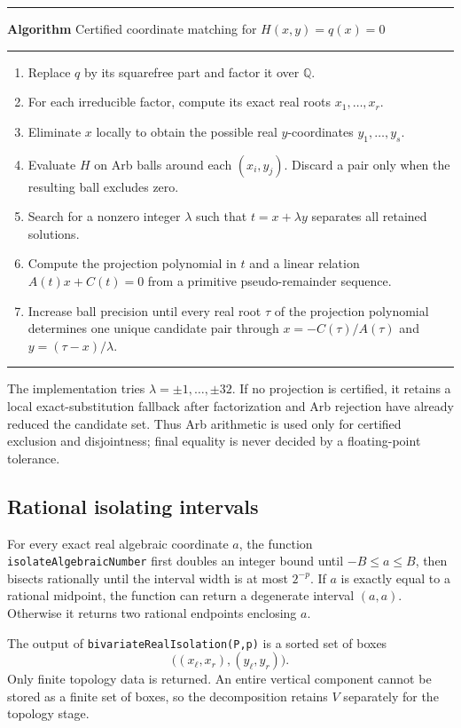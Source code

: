 \documentclass[11pt,a4paper]{article}
\newcounter{algorithm}
\newenvironment{reportalgorithm}[1]{%
  \refstepcounter{algorithm}%
  \par\medskip\noindent
  \begin{minipage}{\textwidth}
  \hrule\vspace{0.35em}
  \textbf{Algorithm \thealgorithm}\quad #1
  \vspace{0.2em}\hrule\vspace{0.35em}
  \begin{enumerate}[leftmargin=2em,itemsep=0.16em,topsep=0.2em]
}{%
  \end{enumerate}
  \vspace{0.1em}\hrule
  \end{minipage}
  \par\medskip
}
\newcommand{\QQ}{\mathbb{Q}}
\begin{document}
\begin{reportalgorithm}{Certified coordinate matching for $H(x,y)=q(x)=0$}
  \item Replace $q$ by its squarefree part and factor it over $\QQ$.
  \item For each irreducible factor, compute its exact real roots
        $x_1,\ldots,x_r$.
  \item Eliminate $x$ locally to obtain the possible real
        $y$-coordinates $y_1,\ldots,y_s$.
  \item Evaluate $H$ on Arb balls around each $(x_i,y_j)$. Discard a pair only
        when the resulting ball excludes zero.
  \item Search for a nonzero integer $\lambda$ such that
        $t=x+\lambda y$ separates all retained solutions.
  \item Compute the projection polynomial in $t$ and a linear relation
        $A(t)x+C(t)=0$ from a primitive pseudo-remainder sequence.
  \item Increase ball precision until every real root $\tau$ of the projection
        polynomial determines one unique candidate pair through
        $x=-C(\tau)/A(\tau)$ and $y=(\tau-x)/\lambda$.
\end{reportalgorithm}

The implementation tries $\lambda=\pm1,\ldots,\pm32$. If no projection is
certified, it retains a local exact-substitution fallback after factorization
and Arb rejection have already reduced the candidate set. Thus Arb arithmetic
is used only for certified exclusion and disjointness; final equality is never
decided by a floating-point tolerance.

\subsection{Rational isolating intervals}

For every exact real algebraic coordinate $a$, the function
\texttt{isolateAlgebraicNumber} first doubles an integer bound until
$-B\le a\le B$, then bisects rationally until the interval width is at most
$2^{-p}$. If $a$ is exactly equal to a rational midpoint, the function can
return a degenerate interval $(a,a)$. Otherwise it returns two rational
endpoints enclosing $a$.

The output of \texttt{bivariateRealIsolation(P,p)} is a sorted set of boxes
\[
  \bigl((x_{\ell},x_r),(y_{\ell},y_r)\bigr).
\]
Only finite topology data is returned. An entire vertical component cannot be
stored as a finite set of boxes, so the decomposition retains $V$ separately
for the topology stage.
\end{document}
